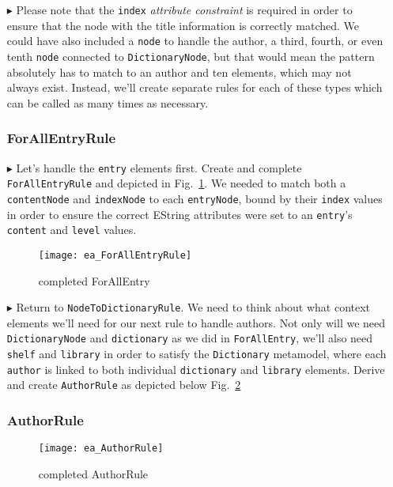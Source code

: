 \begin{itemize}
\item[$\blacktriangleright$] Please note that the \texttt{index} \emph{attribute constraint} is required in order to ensure that the node with the title
information is correctly matched. We could have also included a \texttt{node} to handle the author, a third, fourth, or even tenth \texttt{node} connected to
\texttt{DictionaryNode}, but that would mean the pattern absolutely has to match to an author and ten elements, which may not always exist. Instead, we'll
create separate rules for each of these types which can be called as many times as necessary.

\subsubsection{ForAllEntryRule} %

\item[$\blacktriangleright$] Let's handle the \texttt{entry} elements first. Create and complete \texttt{For\-All\-Ent\-ry\-Rule} and depicted in
Fig.~\ref{ea:ForAllEntry_Complete}. We needed to match both a \texttt{contentNode} and \texttt{indexNode} to each \texttt{entryNode}, bound by their
\texttt{index} values in order to ensure the correct EString attributes were set to an \texttt{entry}'s \texttt{content} and \texttt{level} values.

\vspace{0.5cm}

\begin{figure}[htbp]
\begin{center}
  \texttt{[image: ea\_ForAllEntryRule]}
  \caption{completed ForAllEntry}
  \label{ea:ForAllEntry_Complete}
\end{center}
\end{figure}

\clearpage

\item[$\blacktriangleright$] Return to \texttt{NodeToDictionaryRule}. We need to think about what context elements we'll need for our next rule to handle
authors. Not only will we need \texttt{DictionaryNode} and \texttt{dictionary} as we did in \texttt{ForAllEntry}, we'll also need \texttt{shelf} and
\texttt{library} in order to satisfy the \texttt{Dictionary} metamodel, where each \texttt{author} is linked to both individual \texttt{dictionary} and
\texttt{library} elements. Derive and create \texttt{AuthorRule} as depicted below Fig.~\ref{ea:AuthorRule}

\subsubsection{AuthorRule} %

\begin{figure}[htbp]
\begin{center}
  \texttt{[image: ea\_AuthorRule]}
  \caption{completed AuthorRule}
  \label{ea:AuthorRule}
\end{center}
\end{figure}

\end{itemize}

